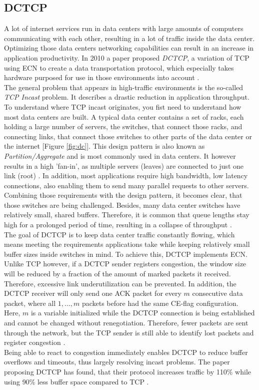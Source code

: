 \documentclass[a4paper,conference]{IEEEtran}
\begin{document}
\subsection{DCTCP}
A lot of internet services run in data centers with large amounts of computers communicating with each other, resulting in a lot of traffic inside the data center. Optimizing those data centers networking capabilities can result in an increase in application productivity. In 2010 a paper proposed \textit{DCTCP}, a variation of TCP using ECN to create a data transportation protocol, which especially takes hardware purposed for use in those environments into account \cite{10.1145/1851275.1851192}.\\
The general problem that appears in high-traffic environments is the so-called \textit{TCP Incast} problem. It describes a drastic reduction in application throughput. To understand where TCP incast originates, you fist need to understand how most data centers are built. A typical data center contains a set of racks, each holding a large number of servers, the switches, that connect those racks, and connecting links, that connect those switches to other parts of the data center or the internet [Figure \ref{fig:dc}]. This design pattern is also known as \textit{Partition/Aggregate} and is most commonly used in data centers. It however results in a high 'fan-in', as multiple servers (leaves) are connected to just one link (root) \cite{10.1145/1851275.1851192,10.1145/1592681.1592693}. In addition, most applications require high bandwidth, low latency connections, also enabling them to send many parallel requests to other servers. Combining those requirements with the design pattern, it becomes clear, that those switches are being challenged. Besides, many data center switches have relatively small, shared buffers. Therefore, it is common that queue lengths stay high for a prolonged period of time, resulting in a collapse of throughput \cite{10.1145/1851275.1851192,10.1145/1592681.1592693}.\\
The goal of DCTCP is to keep data center traffic constantly flowing, which means meeting the requirements applications take while keeping relatively small buffer sizes inside switches in mind. To achieve this, DCTCP implements ECN. Unlike TCP however, if a DCTCP sender registers congestion, the window size will be reduced by a fraction of the amount of marked packets it received. Therefore, excessive link underutilization can be prevented. In addition, the DCTCP receiver will only send one ACK packet for every $m$ consecutive data packet, where all $1,...,m$ packets before had the same CE-flag configuration. Here, $m$ is a variable initialized while the DCTCP connection is being established and cannot be changed without renegotiation. Therefore, fewer packets are sent through the network, but the TCP sender is still able to identify lost packets and register congestion \cite{10.1145/1851275.1851192}.
\\Being able to react to congestion immediately enables DCTCP to reduce buffer overflows and timeouts, thus largely resolving incast problems. The paper proposing DCTCP has found, that their protocol increases traffic by 110\% while using 90\% less buffer space compared to TCP \cite{10.1145/1851275.1851192}.
\end{document}

